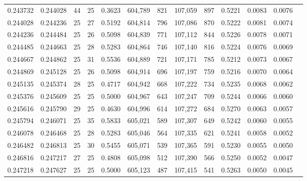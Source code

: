 \begin{tabular}{rrrrrrrrrrrrr}
0.243732 & 0.244028 &  44 &  25 &                                     0.3623 & 604,789 &     821 & 107,059 &     897 & 0.5221 & 0.0083 & 0.0076 \\
0.244028 & 0.244236 &  25 &  27 &                                     0.5192 & 604,814 &     796 & 107,086 &     870 & 0.5222 & 0.0081 & 0.0074 \\
0.244236 & 0.244484 &  25 &  26 &                                     0.5098 & 604,839 &     771 & 107,112 &     844 & 0.5226 & 0.0078 & 0.0071 \\
0.244485 & 0.244663 &  25 &  28 &                                     0.5283 & 604,864 &     746 & 107,140 &     816 & 0.5224 & 0.0076 & 0.0069 \\
0.244667 & 0.244862 &  25 &  31 &                                     0.5536 & 604,889 &     721 & 107,171 &     785 & 0.5212 & 0.0073 & 0.0067 \\
0.244869 & 0.245128 &  25 &  26 &                                     0.5098 & 604,914 &     696 & 107,197 &     759 & 0.5216 & 0.0070 & 0.0064 \\
0.245135 & 0.245374 &  28 &  25 &                                     0.4717 & 604,942 &     668 & 107,222 &     734 & 0.5235 & 0.0068 & 0.0062 \\
0.245376 & 0.245609 &  25 &  25 &                                     0.5000 & 604,967 &     643 & 107,247 &     709 & 0.5244 & 0.0066 & 0.0060 \\
0.245616 & 0.245790 &  29 &  25 &                                     0.4630 & 604,996 &     614 & 107,272 &     684 & 0.5270 & 0.0063 & 0.0057 \\
0.245794 & 0.246071 &  25 &  35 &                                     0.5833 & 605,021 &     589 & 107,307 &     649 & 0.5242 & 0.0060 & 0.0055 \\
0.246078 & 0.246468 &  25 &  28 &                                     0.5283 & 605,046 &     564 & 107,335 &     621 & 0.5241 & 0.0058 & 0.0052 \\
0.246482 & 0.246813 &  25 &  30 &                                     0.5455 & 605,071 &     539 & 107,365 &     591 & 0.5230 & 0.0055 & 0.0050 \\
0.246816 & 0.247217 &  27 &  25 &                                     0.4808 & 605,098 &     512 & 107,390 &     566 & 0.5250 & 0.0052 & 0.0047 \\
0.247218 & 0.247627 &  25 &  25 &                                     0.5000 & 605,123 &     487 & 107,415 &     541 & 0.5263 & 0.0050 & 0.0045 \\

\end{tabular}
